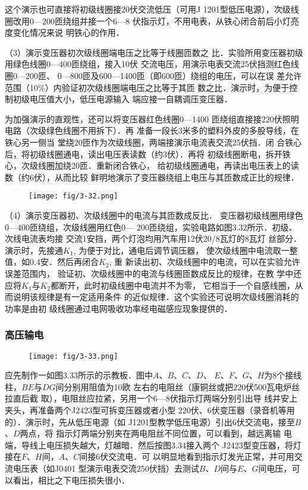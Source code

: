这个演示也可直接将初级线圈接20伏交流低压（可用J
1201型低压电源），次级线圈改用0—200匝绕组并接一个6—8
伏指示灯，不用电表，从铁心闭合前后小灯亮度变化情况来说
明铁心的作用．

（3）演示变压器初次级线圈端电压之比等于线圈匝数之
比．实验所用变压器初级用绿色线圈0—400匝绕组，接入10伏
交流电压，用演示电表交流25伏挡测红色线圈0—200匝、
0—800匝及600—1400匝（即600匝）绕组的电压，可以在误
差允许范围（10\%）内验证初次级线圈端电压之比等于其匝
数之比．演示时，为便于控制初级电压值大小，低压电源输入
端应接一自耦调压变压器．

为加强演示的直观性，还可以将变压器红色线圈0—1400
匝绕组直接接220伏照明电路（次级绿色线圈不用拆下）．再
准备一段长3米多的塑料外皮的多股导线，在铁心另一侧当
堂绕20匝作为次级线圈，两端接演示电流表交流25伏挡．闭
合铁心后，将初级线圈通电，读出电压表读数（约3伏）．再将
初级线圈断电，拆开铁心，次级线圈加绕20匝．重新闭合铁心，
给初级线圈通电，再读出电压表上的读数（约6伏），从而比较
鲜明地演示了变压器绕组上电压与其匝数成正比的规律．

\begin{figure}[htp]
    \centering
\texttt{[image: fig/3-32.png]}
    \caption{}
\end{figure}

（4）演示变压器初、次级线圈中的电流与其匝数成反比．
变压器初级线圈用绿色0—400匝绕组，次级线圈用红色0—
200匝绕组，实验电路如图3.32所示．初级、次线电流表均接
交流1安挡，两个灯泡均用汽车用12伏20/8瓦灯的8瓦灯
丝部分．演示时，先接通$K_1$, 为便于对比，通电后调节调压器，
使次级线圈中电流取一整值，如0.4安．然后再闭合$K_2$, 重
新读出初、次级线圈中的电流，可以在实验允许误差范围内，
验证初、次级线圈中的电流与线圈匝数成反比的规律，在教
学中还应将$K_1$与$K_2$都断开，此时初级线圈中电流并不为零，
它相当于一个自感线圈，从而说明该规律是有一定适用条件
的近似规律．这个实验还可说明次级线圈消耗的功率是由初
级线圈通过电网吸收功率经电磁感应现象提供的．

\subsubsection{高压输电}

\begin{figure}[htp]
    \centering
\texttt{[image: fig/3-33.png]}
    \caption{}
\end{figure}

应先制作一如图3.33所示的示教板．图中$A$、$B$、$C$、$D$、
$E$、$F$、$G$、$H$为8个接线柱，$BE$与$DG$间分别用阻值为10欧
左右的电阻丝（康铜丝或把220伏500瓦电炉丝拉直后截
取），电阻丝应拉紧，另用一个6—8伏指示灯两端分别引出导
线并安上夹头，再准备两个J2423型可拆变压器或者小型
220伏、6伏变压器（录音机等用的）．演示时，先从低压电源（如
J1201型教学低压电源）引出6伏交流电，接至$B$、$D$两点，将
指示灯两端分别夹在两电阻丝不同位置，可以看到，越远离输
电端，导线上电压损失越大，灯越暗．然后按图3.34接入两个
J2423型变压器，将灯接在$F$、$H$间，$A$、$C$间接6伏交流电．可
以明显地看到指示灯发光正常，并可用交流电压表（如J0401
型演示电表交流250伏挡）去测试$B$、$D$间与$E$、$G$间电压，可
以看出，相比之下电压损失很小．

